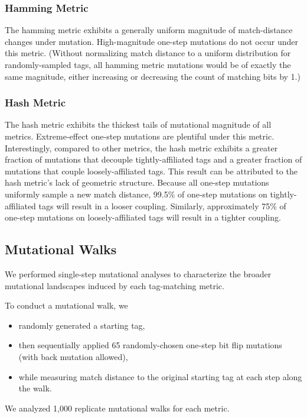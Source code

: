 \subsubsection{Hamming Metric}

The hamming metric exhibits a generally uniform magnitude of match-distance changes under mutation.
High-magnitude one-step mutations do not occur under this metric.
(Without normalizing match distance to a uniform distribution for randomly-sampled tags, all hamming metric mutations would be of exactly the same magnitude, either increasing or decreasing the count of matching bits by 1.)

\subsubsection{Hash Metric}

The hash metric exhibits the thickest tails of mutational magnitude of all metrics.
Extreme-effect one-step mutations are plentiful under this metric.
Interestingly, compared to other metrics, the hash metric exhibits a greater fraction of mutations that decouple tightly-affiliated tags and a greater fraction of mutations that couple loosely-affiliated tags.
This result can be attributed to the hash metric's lack of geometric structure.
Because all one-step mutations uniformly sample a new match distance, 99.5\% of one-step mutations on tightly-affiliated tags will result in a looser coupling.
Similarly, approximately 75\% of one-step mutations on loosely-affiliated tags will result in a tighter coupling.

\subsection{Mutational Walks} \label{sec:mutational_walks}



We performed single-step mutational analyses to characterize the broader mutational landscapes induced by each tag-matching metric.

To conduct a mutational walk, we 
\begin{itemize}
    \item randomly generated a starting tag,
    \item then sequentially applied 65 randomly-chosen one-step bit flip mutations (with back mutation allowed),
    \item while measuring match distance to the original starting tag at each step along the walk.    
\end{itemize}
We analyzed 1,000 replicate mutational walks for each metric.

